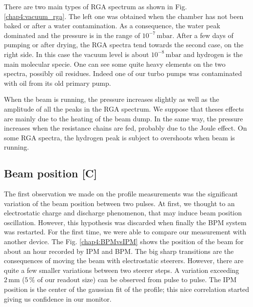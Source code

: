 \begin{refsection}
  There are two main types of RGA spectrum as shown in Fig. \ref{chap4:vacuum_rga}. The left one  was obtained when the chamber has not been baked or after a water contamination. As a consequence, the water peak dominated and the pressure is in the range of $10^{-7}\,\mathrm{mbar}$. After a few days of pumping or after drying, the RGA spectra tend towards the second case, on the right side. In this case the vacuum level is about $10^{-8}\,\mathrm{mbar}$ and hydrogen is the main molecular specie. One can see some quite heavy elements on the two spectra, possibly oil residues. Indeed one of our turbo pumps was contaminated with oil from its old primary pump.

  

  When the beam is running, the pressure increases slightly as well as the amplitude of all the peaks in the RGA spectrum. We suppose that theses effects are mainly due to the heating of the beam dump. In the same way, the pressure increases when the resistance chains are fed, probably due to the Joule effect. On some RGA spectra, the hydrogen peak is subject to overshoots when beam is running.

  \subsection{Beam position [C]}

  The first observation we made on the profile measurements was the significant variation of the beam position between two pulses. At first, we thought to an electrostatic charge and discharge phenomenon, that may induce beam position oscillation. However, this hypothesis was discarded when finally the BPM system was restarted. For the first time, we were able to compare our measurement with another device. The Fig. \ref{chap4:BPMvsIPM} shows the position of the beam for about an hour recorded by IPM and BPM. The big sharp transitions are the consequences of moving the beam with electrostatic steerers. However, there are quite a few smaller variations between two steerer steps. A variation exceeding $2\,\mathrm{mm}$ ($5\,\mathrm{\%}$ of our readout size) can be observed from pulse to pulse. The IPM position is the center of the gaussian fit of the profile; this nice correlation started giving us confidence in our monitor.

  


\end{refsection}
